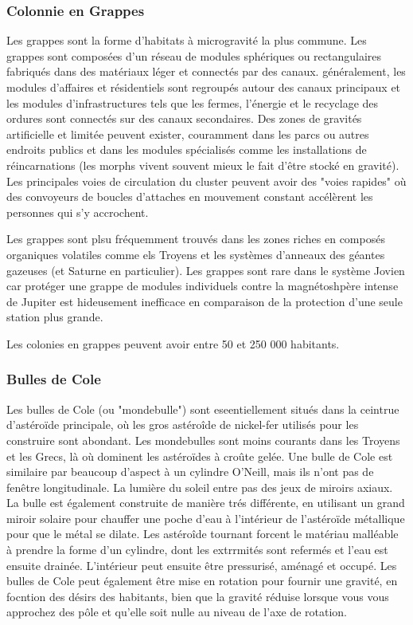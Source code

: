 \subsubsection{Colonnie en Grappes} 

Les grappes sont la forme d'habitats à microgravité la plus commune. Les grappes sont composées d'un réseau de modules sphériques ou rectangulaires fabriqués dans des matériaux léger et connectés par des canaux. généralement, les modules d'affaires et résidentiels sont regroupés autour des canaux principaux et les modules d'infrastructures tels que les fermes, l'énergie et le recyclage des ordures sont connectés sur des canaux secondaires. Des zones de gravités artificielle et limitée peuvent exister, couramment dans les parcs ou autres endroits publics et dans les modules spécialisés comme les installations de réincarnations (les morphs vivent souvent mieux le fait d'être stocké en gravité). Les principales voies de circulation du cluster peuvent avoir des "voies rapides" où des convoyeurs de boucles d'attaches en mouvement constant accélèrent les personnes qui s'y accrochent. 

Les grappes sont plsu fréquemment trouvés dans les zones riches en composés organiques volatiles comme els Troyens et les systèmes d'anneaux des géantes gazeuses (et Saturne en particulier). Les grappes sont rare dans le système Jovien car protéger une grappe de modules individuels contre la magnétoshpère intense de Jupiter est hideusement inefficace en comparaison de la protection d'une seule station plus grande. 

Les colonies en grappes peuvent avoir entre 50 et 250 000 habitants. 

\subsubsection{Bulles de Cole} 

Les bulles de Cole (ou "mondebulle") sont eseentiellement situés dans la ceintrue d'astéroïde principale, où les gros astéroîde de nickel-fer utilisés pour les construire sont abondant. Les mondebulles sont moins courants dans les Troyens et les Grecs, là où dominent les astéroïdes à croûte gelée. Une bulle de Cole est similaire par beaucoup d'aspect à un cylindre O'Neill, mais ils n'ont pas de fenêtre longitudinale. La lumière du soleil entre pas des jeux de miroirs axiaux. La bulle est également construite de manière trés différente, en utilisant un grand miroir solaire pour chauffer une poche d'eau à l'intérieur de l'astéroïde métallique pour que le métal se dilate. Les astéroîde tournant forcent le matériau malléable à prendre la forme d'un cylindre, dont les extrrmités sont refermés et l'eau est ensuite drainée. L'intérieur peut ensuite être pressurisé, aménagé et occupé. Les bulles de Cole peut également être mise en rotation pour fournir une gravité, en focntion des désirs des habitants, bien que la gravité réduise lorsque vous vous approchez des pôle et qu'elle soit nulle au niveau de l'axe de rotation. 

